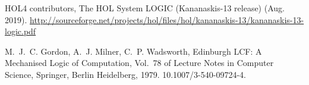 \documentclass[GCNS]{yincog}
\theoremstyle{remark}
\theoremstyle{theorem}
\theoremstyle{remark}
\begin{document}
\begin{backmatter}
\begin{thebibliography}{}
\begin{bsubitem}
\begin{bcontribution}%
\end{bcontribution}
\begin{bhost}
\begin{bbook}%
\end{bbook}
\end{bhost}
\begin{bhost}
\begin{behost}
\end{behost}
\end{bhost}
\end{bsubitem}
%
\OrigBibText
{HOL4 contributors},
{{The
HOL System LOGIC (Kananaskis-13 release)}} (Aug. 2019).
\url{http://sourceforge.net/projects/hol/files/hol/kananaskis-13/kananaskis-13-logic.pdf}
\endOrigBibText
{}%
\endbibitem

\begin{bsubitem}
\begin{bcontribution}%
\end{bcontribution}
\begin{bhost}
\begin{bbook}
\end{bbook}
\end{bhost}
\end{bsubitem}
%
\OrigBibText
M.~J.~C. Gordon, A.~J. Milner, C.~P. Wadsworth, Edinburgh {LCF}: A Mechanised
Logic of Computation, Vol.~78 of Lecture Notes in Computer Science, Springer,
Berlin Heidelberg, 1979. 10.1007/3-540-09724-4.
\endOrigBibText
{}%
\endbibitem


\end{thebibliography}
\end{backmatter}
\end{document}
